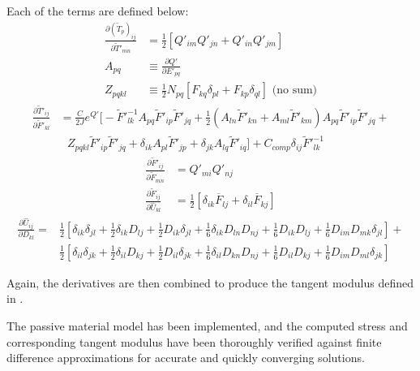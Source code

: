 Each of the terms are defined below:
\begin{align}
\frac{\partial (\tilde{T}_p)_{ij}}{\partial \tilde{T}'_{mn}} &= \frac{1}{2}\left[Q'_{im}Q'_{jn} + Q'_{in}Q'_{jm}\right] \\
A_{pq} &\equiv \frac{\partial Q'}{\partial E'_{pq}} \\
Z_{pqkl} &\equiv \frac{1}{2}N_{pq}\left[F_{kq}\delta_{pl} + F_{kp}\delta_{ql}\right] \text{ (no sum)}
\end{align}
\begin{equation}
\begin{aligned}
\frac{\partial \tilde{T}'_{ij}}{\partial \tilde{F}'_{kl}} &= \frac{C}{2J}e^{Q'} \Bigg[-\tilde{F}'^{-1}_{lk}A_{pq}\tilde{F}'_{ip}\tilde{F}'_{jq} + \frac{1}{2}(A_{ln}\tilde{F}'_{kn} + A_{ml}\tilde{F}'_{km})A_{pq}\tilde{F}'_{ip}\tilde{F}'_{jq} + \\
&\text{\ \ \ }Z_{pqkl}\tilde{F}'_{ip}\tilde{F}'_{jq} + \delta_{ik}A_{pl}\tilde{F}'_{jp} + \delta_{jk}A_{lq}\tilde{F}'_{iq}\Bigg] + C_{comp}\delta_{ij}\tilde{F}'^{-1}_{lk}
\end{aligned}
\end{equation}
\begin{align}
\frac{\partial \tilde{F}'_{ij}}{\partial \tilde{F}_{mn}} &= Q'_{mi}Q'_{nj} \\
\frac{\partial \tilde{F}_{ij}}{\partial \hat{U}_{kl}} &= \frac{1}{2}\left[\delta_{ik}\overline{F}_{lj} + \delta_{il}\overline{F}_{kj}\right]
\end{align}
\begin{equation}
\begin{aligned}
\frac{\partial \hat{U}_{ij}}{\partial D_{kl}} = &\frac{1}{2}\left[\delta_{ik}\delta_{jl} + \frac{1}{2}\delta_{ik}D_{lj} + \frac{1}{2}D_{ik}\delta_{jl} + \frac{1}{6}\delta_{ik}D_{ln}D_{nj} + \frac{1}{6}D_{ik}D_{lj} + \frac{1}{6}D_{im}D_{mk}\delta_{jl}\right] + \\
&\frac{1}{2}\left[\delta_{il}\delta_{jk} + \frac{1}{2}\delta_{il}D_{kj} + \frac{1}{2}D_{il}\delta_{jk} + \frac{1}{6}\delta_{il}D_{kn}D_{nj} + \frac{1}{6}D_{il}D_{kj} + \frac{1}{6}D_{im}D_{ml}\delta_{jk}\right]
\end{aligned}
\end{equation}

Again, the derivatives are then combined to produce the tangent modulus defined in .

The passive material model has been implemented, and the computed stress and corresponding tangent modulus have been thoroughly verified against finite difference approximations for accurate and quickly converging solutions.

